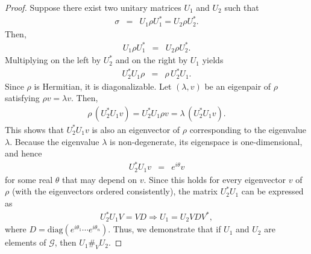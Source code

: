 \documentclass[sn-mathphys-num]{sn-jnl}%
\theoremstyle{thmstyleone}%
\theoremstyle{thmstyletwo}%
\theoremstyle{thmstylethree}%
\begin{document}
%
\begin{proof}
    Suppose there exist two unitary matrices $U_1$ and $U_2$ such that
    \begin{eqnarray*}
    \sigma &=& U_1 \rho U_1^* = U_2 \rho U_2^*.
    \end{eqnarray*}
    Then,
    \begin{eqnarray*}
    U_1 \rho U_1^* &=& U_2 \rho U_2^*.
    \end{eqnarray*}
    Multiplying on the left by $U_2^*$ and on the right by $U_1$ yields
    \begin{eqnarray*}
    U_2^* U_1 \rho &=& \rho\, U_2^* U_1.
    \end{eqnarray*}
    Since $\rho$ is Hermitian, it is diagonalizable. 
    {Let $(\lambda, v)$ be an eigenpair of $\rho$ satisfying $\rho v = \lambda v$. Then,
    \begin{eqnarray*}
    \rho\, (U_2^* U_1 v) = U_2^* U_1 \rho v = \lambda \, (U_2^* U_1 v).
    \end{eqnarray*}
    }
    This shows that $U_2^* U_1 v$ is also an eigenvector of $\rho$ corresponding to the eigenvalue $\lambda$. Because the eigenvalue $\lambda$ is non-degenerate, its eigenspace is one-dimensional, and hence
    \begin{eqnarray*}
    U_2^* U_1 v &=& e^{i\theta} v
    \end{eqnarray*}
    for some real $\theta$ that may depend on $v$. Since this holds for every eigenvector $v$ of $\rho$ (with the eigenvectors ordered consistently), the matrix $U_2^* U_1$ can be expressed as 
    \begin{eqnarray*}
        U_2^* U_1 V = V D \Rightarrow U_1 = U_2 V D V^*,
    \end{eqnarray*}
    where $D = \mbox{diag}(e^{i\theta_1}\cdots e^{i\theta_n})$. 
{Thus, we demonstrate that if $U_1$ and $U_2$ are elements of $\mathcal{G}$, then $U_1 \#_V U_2$.}
\end{proof}
%
%
%
%
%
%
 
\end{document}
